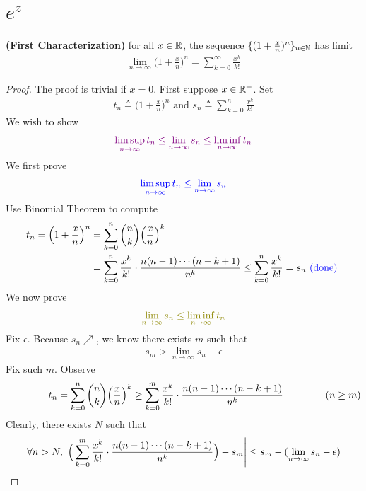 \documentclass{report}
\begin{document}
\section{$e^z$}
\begin{theorem}
\textbf{(First Characterization)} for all $x\in\mathbb{R}$, the sequence $\{ (1+\frac{x}{n})^n \}_{n\in\mathbb{N}}$ has limit 
\begin{align*}
\lim_{n\to \infty} \Big(1+\frac{x}{n}\Big)^n = \sum_{k=0}^\infty \frac{x^k}{k!}
\end{align*}
\end{theorem}
\begin{proof}
The proof is trivial if $x=0$. First suppose  $x\in\mathbb{R}^+$. Set 
\begin{align*}
t_n\triangleq \Big(1+\frac{x}{n}\Big)^n\text{ and }s_n\triangleq \sum_{k=0}^n \frac{x^k}{k!}
\end{align*}
We wish to show 
\begin{align*}
\textcolor{violet}{\limsup_{n\to\infty} t_n\leq \lim_{n\to \infty}s_n\leq \liminf_{n\to\infty} t_n}
\end{align*}
We first prove 
\begin{align*}
\textcolor{blue}{\limsup_{n\to\infty} t_n\leq \lim_{n\to \infty}s_n}
\end{align*}
Use Binomial Theorem to compute 
\begin{align*}
t_n=\Big(1+\frac{x}{n} \Big)^n&= \sum_{k=0}^n \binom{n}{k} \Big(\frac{x}{n} \Big)^k\\
&=\sum_{k=0}^n \frac{x^k}{k!} \cdot \frac{n(n-1)\cdots (n-k+1)}{n^k} \leq \sum_{k=0}^n \frac{x^k}{k!}=s_n \textcolor{blue}{\text{ (done) }}
\end{align*}
We now prove 
\begin{align*}
\olive{\lim_{n\to \infty}s_n\leq \liminf_{n\to\infty} t_n}
\end{align*}
Fix $\epsilon $. Because $s_n\nearrow $, we know there exists  $m$ such that 
 \begin{align*}
s_m> \lim_{n\to \infty}s_n -\epsilon 
\end{align*}
Fix such $m$. Observe 
 \begin{align*}
\hspace{1.5cm}t_n=\sum _{k=0}^n \binom{n}{k}\Big(\frac{x}{n} \Big)^k\geq \sum_{k=0}^m \frac{x^k}{k!}\cdot \frac{n(n-1)\cdots (n-k+1)}{n^k}\hspace{1.5cm}(n\geq m)
\end{align*}
Clearly, there exists $N$ such that 
\begin{align*}
  \forall n>N, \abso{\Big( \sum_{k=0}^m \frac{x^k}{k!}\cdot \frac{n(n-1)\cdots (n-k+1)}{n^k}\Big) - s_m }\leq  s_m-(\lim_{n\to \infty}s_n-\epsilon )

\end{align*}
\end{proof}
\end{document}
